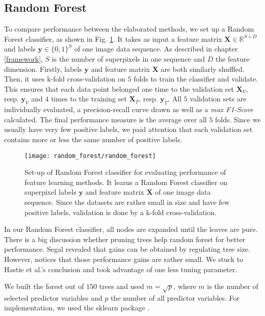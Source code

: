 \subsection{Random Forest} \label{random_forest}
To compare performance between the elaborated methods, we set up a Random Forest classifier, as shown in Fig. \ref{fig:random_forest}.
It takes as input a feature matrix $\boldsymbol{X} \in \mathbb{R}^{S \times D}$ and labels $\boldsymbol{y} \in \{0,1\}^{S}$ of one image data sequence.
As described in chapter \ref{framework}, $S$ is the number of superpixels in one sequence and $D$ the feature dimension.
Firstly, labels $\boldsymbol{y}$ and feature matrix $\boldsymbol{X}$ are both similarly shuffled.
Then, it uses k-fold cross-validation on $5$ folds to train the classifier and validate.
This ensures that each data point belonged one time to the validation set $\boldsymbol{X}_V$, resp. $\boldsymbol{y}_V$ and $4$ times to the training set $\boldsymbol{X}_T$, resp. $\boldsymbol{y}_T$. All $5$ validation sets are individually evaluated, a precision-recall curve drawn as well as a \textit{max F1-Score} calculated. The final performance measure is the average over all $5$ folds. Since we usually have very few positive labels, we paid attention that each validation set contains more or less the same number of positive labels.

\begin{figure}[htbp]
  \centering
  \texttt{[image: random\_forest/random\_forest]}
  \caption[Illustration of Random Forest classifier]{Set-up of Random Forest classifier for evaluating performance of feature learning methods. It learns a Random Forest classifier on superpixel labels $\boldsymbol{y}$ and feature matrix $\boldsymbol{X}$ of one image data sequence. Since the datasets are rather small in size and have few positive labels, validation is done by a k-fold cross-validation.}
  \label{fig:random_forest}
\end{figure}

In our Random Forest classifier, all nodes are expanded until the leaves are pure.
There is a big discussion whether pruning trees help random forest for better performance.
Segal \cite{segal04} revealed that gains can be obtained by regulating tree size.
However, \cite[pg. 596]{hastie09} notices that those performance gains are rather small. We stuck to Hastie et al.'s conclusion and took advantage of one less tuning parameter.

We built the forest out of $150$ trees and used $m=\sqrt{p}$, where $m$ is the number of selected predictor variables and $p$ the number of all predictor variables. For implementation, we used the sklearn package \cite{scikit-learn}.

